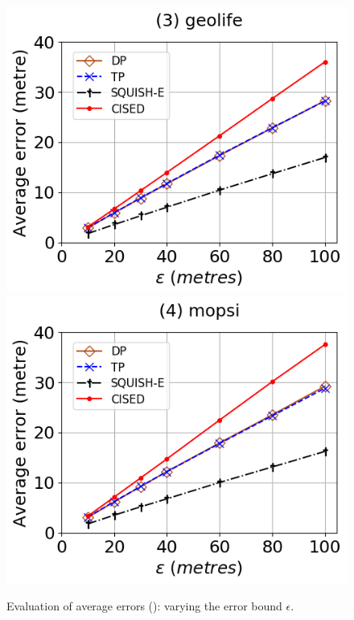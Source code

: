 \begin{figure}[tb!]
	\includegraphics[scale=0.315]{Figures/Exp-SED-error-epsilon-geolife.png}	\hspace{1ex}
	\includegraphics[scale=0.315]{Figures/Exp-SED-error-epsilon-mopsi.png}		
	\vspace{-2.5ex}
	\caption{\small Evaluation of average errors (\sed): varying the error bound $\epsilon$.}
	\label{fig:ae-sed-epsilon}
	\vspace{-3ex}
\end{figure}

